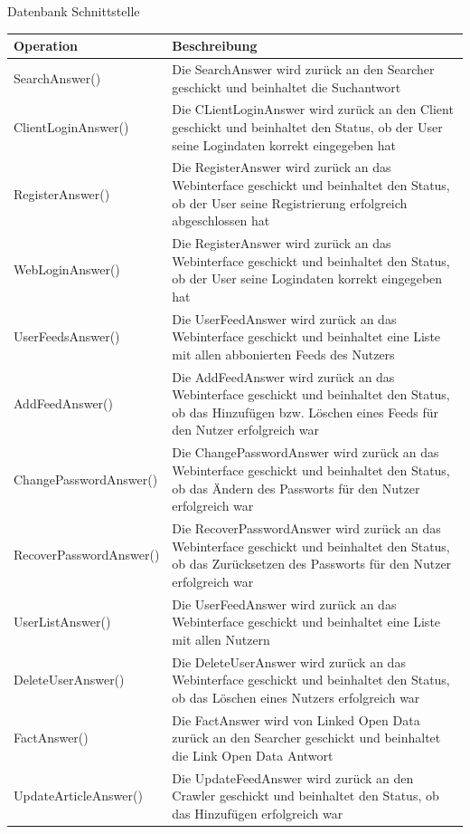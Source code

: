 \begin{interface}{30}{Datenbank Schnittstelle}
\setlength{\LTpre}{-0,45cm}
\begin{longtable}[l]{|p{5cm}|p{9cm}|}

\hline
Operation & Beschreibung\\
\hline
SearchAnswer() & Die SearchAnswer wird zurück an den Searcher geschickt und
beinhaltet die Suchantwort\\
\hline
ClientLoginAnswer() & Die CLientLoginAnswer wird zurück an den Client geschickt
und beinhaltet den Status, ob der User seine Logindaten korrekt eingegeben hat\\
\hline
RegisterAnswer() & Die RegisterAnswer wird zurück an das Webinterface geschickt
und beinhaltet den Status, ob der User seine Registrierung erfolgreich
abgeschlossen hat\\
\hline
WebLoginAnswer() & Die RegisterAnswer wird zurück an das Webinterface geschickt
und beinhaltet den Status, ob der User seine Logindaten korrekt eingegeben hat\\
\hline
UserFeedsAnswer() & Die UserFeedAnswer wird zurück an das Webinterface geschickt
und beinhaltet eine Liste mit allen abbonierten Feeds des Nutzers\\
\hline
AddFeedAnswer() & Die AddFeedAnswer wird zurück an das Webinterface geschickt
und beinhaltet den Status, ob das Hinzufügen bzw. Löschen eines Feeds für den
Nutzer erfolgreich war\\
\hline
ChangePasswordAnswer() & Die ChangePasswordAnswer wird zurück an das Webinterface geschickt
und beinhaltet den Status, ob das Ändern des Passworts für den
Nutzer erfolgreich war\\
\hline
RecoverPasswordAnswer() & Die RecoverPasswordAnswer wird zurück an das Webinterface geschickt
und beinhaltet den Status, ob das Zurücksetzen des Passworts für den
Nutzer erfolgreich war\\
\hline
UserListAnswer() & Die UserFeedAnswer wird zurück an das Webinterface geschickt
und beinhaltet eine Liste mit allen Nutzern\\
\hline
DeleteUserAnswer() & Die DeleteUserAnswer wird zurück an das Webinterface geschickt
und beinhaltet den Status, ob das Löschen eines Nutzers erfolgreich war\\
\hline
FactAnswer() & Die FactAnswer wird von Linked Open Data zurück an den Searcher
geschickt und beinhaltet die Link Open Data Antwort\\
\hline
UpdateArticleAnswer() & Die UpdateFeedAnswer wird zurück an den Crawler
geschickt und beinhaltet den Status, ob das Hinzufügen erfolgreich war\\
\hline
\end{longtable}
\end{interface}

